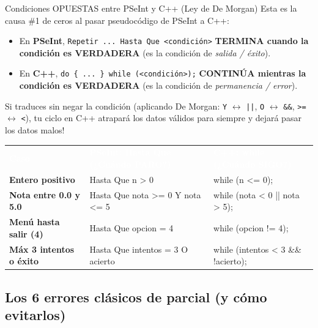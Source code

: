 \documentclass[11pt,letterpaper]{article}
\begin{document}
\begin{peligro}{Condiciones OPUESTAS entre PSeInt y C++ (Ley de De Morgan)}
Esta es la causa \#1 de ceros al pasar pseudocódigo de PSeInt a C++:
\begin{itemize}
  \item En \textbf{PSeInt}, \texttt{Repetir ... Hasta Que <condición>} \textbf{TERMINA cuando la condición es VERDADERA} (es la condición de \emph{salida / éxito}).
  \item En \textbf{C++}, \texttt{do \{ ... \} while (<condición>);} \textbf{CONTINÚA mientras la condición es VERDADERA} (es la condición de \emph{permanencia / error}).
\end{itemize}

Si traduces sin negar la condición (aplicando De Morgan: \texttt{Y} $\leftrightarrow$ \texttt{||}, \texttt{O} $\leftrightarrow$ \texttt{\&\&}, \texttt{>=} $\leftrightarrow$ \texttt{<}), tu ciclo en C++ atrapará los datos válidos para siempre y dejará pasar los datos malos!

\begin{center}
\small
\renewcommand{\arraystretch}{1.25}
\begin{tabularx}{\linewidth}{>{\bfseries\sffamily}p{3.5cm} >{\ttfamily\footnotesize}X >{\ttfamily\footnotesize}X}
\rowcolor{RojoAlerta}
\textcolor{white}{Caso} & \textcolor{white}{\textbf{\sffamily PSeInt: Hasta Que (¿Cuándo PARO?)}} & \textcolor{white}{\textbf{\sffamily C++: while (¿Cuándo SIGO?)}} \\
Entero positivo & Hasta Que n > 0 & while (n <= 0); \\
Nota entre 0.0 y 5.0 & Hasta Que nota >= 0 Y nota <= 5 & while (nota < 0 || nota > 5); \\
Menú hasta salir (4) & Hasta Que opcion = 4 & while (opcion != 4); \\
Máx 3 intentos o éxito & Hasta Que intentos = 3 O acierto & while (intentos < 3 \&\& !acierto); \\
\bottomrule
\end{tabularx}
\end{center}
\end{peligro}

\subsection{Los 6 errores clásicos de parcial (y cómo evitarlos)}
\end{document}
